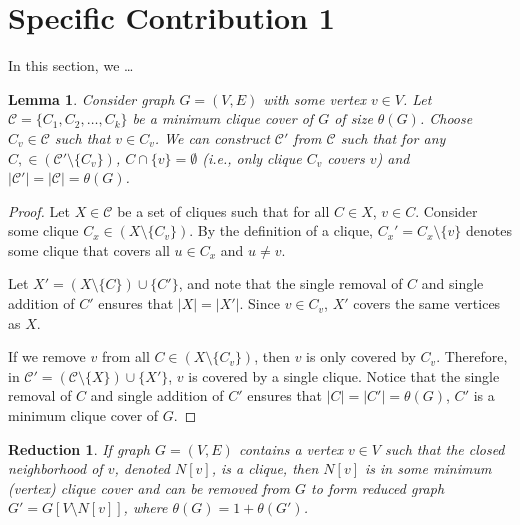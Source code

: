 \documentclass[../techreport.tex]{subfiles}
\begin{document}
\newtheorem{reduction}{Reduction}
\newtheorem{lemma}{Lemma}

\section{Specific Contribution 1}
\label{sec:specific1}
In this section, we \ldots \\

\begin{lemma}
	Consider graph $G = (V, E)$ with some vertex $v \in V$. Let $\mathcal{C} = \{C_1, C_2, \dots, C_k\}$ be a minimum clique cover of $G$ of size $\theta(G)$. Choose $C_v \in \mathcal{C}$ such that $v \in C_v$. We can construct $\mathcal{C'}$ from $\mathcal{C}$ such that for any $C, \in (\mathcal{C'} \setminus \{C_v\})$, $C \cap \{v\} = \emptyset$ (i.e., only clique $C_v$ covers $v$) and $|\mathcal{C'}| = |\mathcal{C}| = \theta(G)$.
\end{lemma}

\begin{proof}
	Let $X \in \mathcal{C}$ be a set of cliques such that for all $C \in X$, $v \in C$. Consider some clique $C_x \in (X \setminus \{C_v\})$. By the definition of a clique, $C_x' = C_x \setminus \{v\}$ denotes some clique that covers all $u \in C_x$ and $u \neq v$. 

	Let $X' = (X \setminus \{C\}) \cup \{C'\}$, and note that the single removal of $C$ and single addition of $C'$ ensures that $|X| = |X'|$. Since $v \in C_v$, $X'$ covers the same vertices as $X$. 

	If we remove $v$ from all $C \in (X \setminus \{C_v\})$, then $v$ is only covered by $C_v$. Therefore, in $\mathcal{C'} = (\mathcal{C} \setminus \{X\}) \cup \{X'\}$, $v$ is covered by a single clique. Notice that the single removal of $C$ and single addition of $C'$ ensures that $|C| = |C'| = \theta(G)$, $C'$ is a minimum clique cover of $G$.
\end{proof}

\begin{reduction} 
	If graph $G = (V, E)$ contains a vertex $v \in V$ such that the closed neighborhood of $v$, denoted $N[v]$, is a clique, then $N[v]$ is in some minimum (vertex) clique cover and can be removed from $G$ to form reduced graph $G' = G[V \setminus N[v]]$, where $\theta(G) = 1 + \theta(G')$.
\end{reduction}
\end{document}
